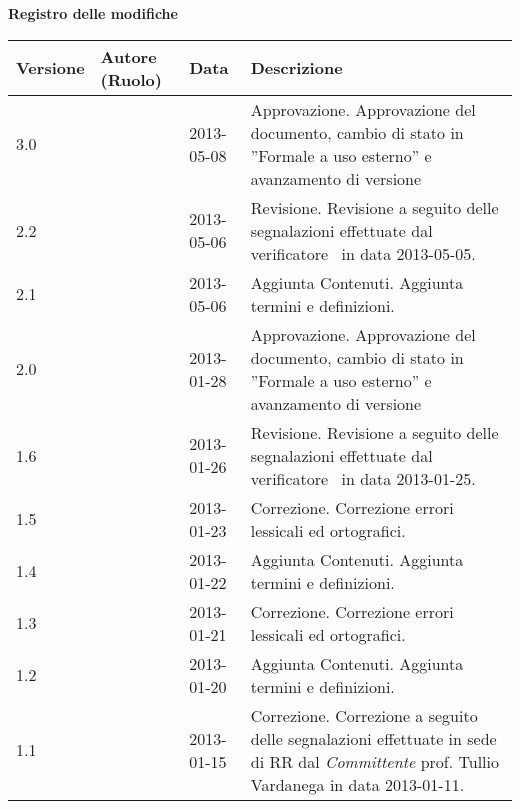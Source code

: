 \Large{\textbf{Registro delle modifiche}}\\
\normalsize

	\label{tabVers}
	\begin{longtable}{p{} p{} p{} p{}} 
	    \toprule
	    \textbf{Versione}	&	\textbf{Autore (Ruolo)}	&	\textbf{Data}		&	\textbf{Descrizione}\\
	    \midrule
	    \midrule
		    3.0	&	\VP	&	2013-05-08		&	Approvazione.\newline
										Approvazione del documento, cambio di stato in ”Formale a uso esterno” e avanzamento di versione\\
		 \midrule
		    2.2	&	\FZ	&	2013-05-06		&	Revisione.\newline
										Revisione a seguito delle segnalazioni effettuate dal verificatore \EZ~in data 2013-05-05.\\
	    \midrule
		    2.1	&	\FZ	&	2013-05-06		&	Aggiunta Contenuti.\newline
										Aggiunta termini e definizioni.\\
	    \midrule
		    2.0	&	\SL	&	2013-01-28		&	Approvazione.\newline
										Approvazione del documento, cambio di stato in ”Formale a uso esterno” e avanzamento di versione\\
	    \midrule
		    1.6	&	\MB	&	2013-01-26		&	Revisione.\newline
										Revisione a seguito delle segnalazioni effettuate dal verificatore \AB~in data 2013-01-25.\\
	    \midrule
		    1.5	&	\MB	&	2013-01-23		&	Correzione.\newline
										Correzione errori lessicali ed ortografici.\\
	    \midrule
		    1.4	&	\EZ	&	2013-01-22		&	Aggiunta Contenuti.\newline 
										Aggiunta termini e definizioni.\\
	    \midrule
		    1.3	&	\EZ	&	2013-01-21		&	Correzione.\newline
										Correzione errori lessicali ed ortografici.\\
	    \midrule
		    1.2	&	\MB	&	2013-01-20		&	Aggiunta Contenuti.\newline 
										Aggiunta termini e definizioni.\\
	    \midrule
		    1.1	&	\EZ	&	2013-01-15		&	Correzione.\newline
										Correzione a seguito delle segnalazioni effettuate in sede di RR dal \textit{Committente} prof. Tullio Vardanega in data 2013-01-11.\\

\end{longtable}
